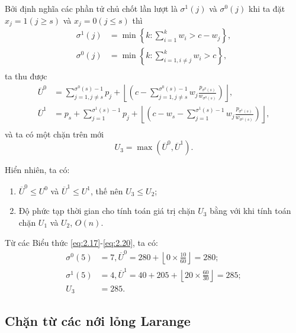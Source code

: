 Bởi định nghĩa các phần tử chủ chốt lần lượt là $\sigma^1(j)$ và $\sigma^0(j)$ khi ta đặt $x_j = 1 (j \geq s)$ và $x_j = 0 (j \leq s)$ thì
\begin{align}
    \label{eq:2.17}
    \sigma^1(j) &= \min\left\{k : \sum_{i=1}^kw_i > c - w_j\right\},\\
    \label{eq:2.18}
    \sigma^0(j) &= \min\left\{k : \sum_{i=1, i \ne j}^kw_i > c\right\},\\
\end{align}
ta thu được
\begin{align}
    \label{eq:2.19}
    \overline{U}^0 &= \sum_{j = 1, j \ne s}^{\sigma^0(s) - 1}p_j + \left \lfloor\left(c - \sum_{j = 1, j \ne s}^{\sigma^0(s) - 1}w_j\frac{p_{\sigma^0(s)}}{w_{\sigma^0(s)}}\right) \right \rfloor,\\
    \label{eq:2.20}
    \overline{U}^1 &= p_s + \sum_{j = 1}^{\sigma^1(s) - 1}p_j + \left \lfloor\left(c - w_s - \sum_{j = 1}^{\sigma^1(s) - 1}w_j\frac{p_{\sigma^1(s)}}{w_{\sigma^1(s)}}\right) \right \rfloor,\\
\end{align}
và ta có một chặn trên mới
\begin{equation}
    U_3 = \max\left(\overline{U}^0, \overline{U}^1\right).
\end{equation}

Hiển nhiên, ta có:
\begin{enumerate}[label=(\alph*)]
    \item $\overline{U}^0 \leq U^0$ và $\overline{U}^1 \leq U^1$, thế nên $U_3 \leq U_2$;
    \item Độ phức tạp thời gian cho tính toán giá trị chặn $U_3$ bằng với khi tính toán chặn $U_1$ và $U_2$, $O(n)$.
\end{enumerate}

\begin{example}
    \label{eq:example_2.1_cont1}
    Từ các Biểu thức \eqref{eq:2.17}-\eqref{eq:2.20}, ta có:
    \begin{align*}
        \sigma^0(5) &= 7, \overline{U}^0 = 280 + \left \lfloor 0 \times \frac{10}{60} \right  \rfloor = 280;\\
        \sigma^1(5) &= 4, \overline{U}^1 = 40 + 205 +\left \lfloor 20 \times \frac{60}{30} \right  \rfloor = 285;\\
        U_3 &= 285.
    \end{align*}
\end{example}

\subsection{Chặn từ các nới lỏng Larange}

